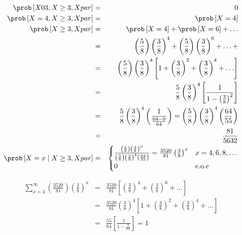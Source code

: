 \begin{enumerate}
\begin{eqnarray*}
\prob \left[X 0 3 , X \geq 3 , X par \right] &=& 0 \\
\prob \left[X=4, X \geq 3 , X par \right] &=& \prob \left[ X=4 \right]\\
\prob \left[X \geq 3 , X par  \right] & = & \prob \left[ X=4 \right] + \prob \left[ X=6\right]+ \ldots \\
&=& \left(\frac{5}{8} \right) \left( \frac{3}{8}\right)^4 + \left( \frac{5}{8} \right) \left(\frac{3}{8} \right)^6 + \ldots +\\
&=&\left(\frac{5}{8} \right) \left( \frac{3}{8}\right)^4  \left[1 + \left(\frac{3}{8} \right)^2  + \left(\frac{3}{8} \right)^4 + \ldots \right]\\
&=&\frac{5}{8} \left(\frac{3}{8} \right)^4 \left[\frac{1}{1- \left(\frac{3}{8} \right)^2} \right]\\
&=&\frac{5}{8} \left(\frac{3}{8} \right)^4 \left(\frac{1}{\frac{64-9}{64}} \right)= \left(\frac{5}{8} \right) \left(\frac{3}{8} \right)^4 \left(\frac{64}{55} \right)\\
&=& \frac{81}{5632}\\
\prob \left[X=x \mid X \geq 3 , X par \right] &=& \begin{cases}
\frac{\left( \frac{5}{8} \right) \left( \frac{3}{8} \right)^{\alpha}}{\left( \frac{5}{8} \right) \left( \frac{3}{8} \right)^{4} \left(\frac{64}{55} \right)}= \frac{3520}{81}\left(\frac{3}{8} \right)^x & x=4,6,8, \ldots\\
0 &  \textrm{e.o.c} 
\end{cases}
\end{eqnarray*}

\begin{eqnarray*}
 \sum_{x=4}^{\infty} \left( \frac{3520}{81} \right)\left(\frac{3}{8} \right)^{x}&=& \frac{3520}{81} \left[\left( \frac{3}{8} \right)^4 + \left(\frac{3}{8} \right)^6+ \ldots \right]\\
 &=& \frac{3520}{81} \left(\frac{3}{8} \right)^4 \left[1 + \left(\frac{3}{8} \right)^2 + \left( \frac{3}{8} \right)^4 + \ldots \right]\\
 &=& \frac{55}{64} \left[ \frac{1}{1 - \frac{9}{64}} \right] = 1
\end{eqnarray*}


\end{enumerate}
